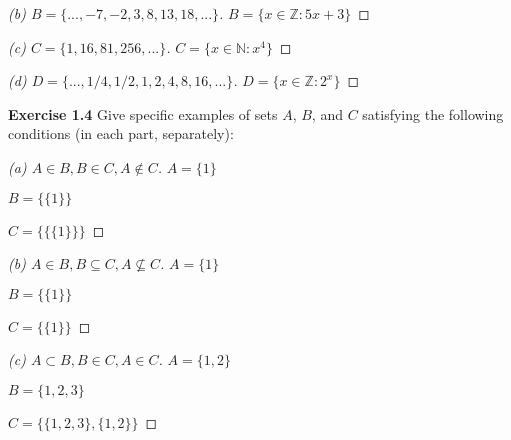 \documentclass[12pt,oneside]{article}
\newenvironment{exercise}[1]{\vspace{.1in}\noindent\textbf{Exercise #1 \hspace{.05em}}}{}
\newcommand{\Z}{\mathbb{Z}}
\newcommand{\N}{\mathbb{N}}
\begin{document}
\begin{proof}[(b) $B = \{..., -7, -2, 3, 8, 13, 18,  ...\}$]

\item$B = \{x \in \Z: 5x+3\}$

\end{proof}

\begin{proof}[(c) $C = \{1, 16, 81, 256, ...\}$]

\item$C = \{x \in \N: x^4\}$

\end{proof}

\begin{proof}[(d) $D = \{..., 1/4, 1/2, 1, 2, 4, 8, 16, ...\}$]

\item$D = \{x \in \Z: 2^{x}\}$

\end{proof}



\begin{exercise}{1.4}
Give specific examples of sets $A$, $B$, and $C$ satisfying the following
conditions (in each part, separately):

\end{exercise}

\begin{proof}[(a) $A \in B, B \in C, A \notin C$]

\item$A = \{1\}$
\item$B = \{\{1\}\}$
\item$C = \{\{\{1\}\}\}$

\end{proof}

\begin{proof}[(b) $A \in B, B \subseteq C, A \nsubseteq C$]

\item$A = \{1\}$
\item$B = \{\{1\}\}$
\item$C = \{\{1\}\}$

\end{proof}

\begin{proof}[(c) $A \subset B, B \in C, A \in C$]

\item$A = \{1, 2\}$
\item$B = \{1, 2, 3\}$
\item$C = \{\{1, 2, 3\}, \{1, 2\}\}$

\end{proof}
\end{document}
